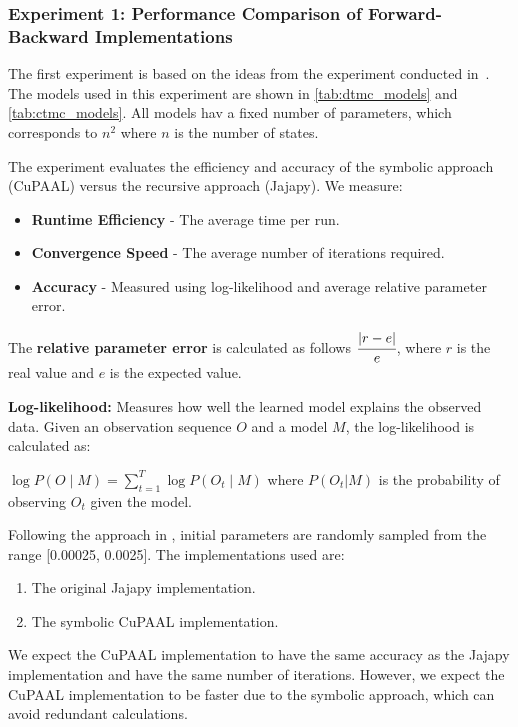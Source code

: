 \subsubsection{Experiment 1: Performance Comparison of Forward-Backward Implementations}
The first experiment is based on the ideas from the experiment conducted in~\cite{reynouard2024learning}.
The models used in this experiment are shown in \autoref{tab:dtmc_models} and \autoref{tab:ctmc_models}.
All models hav a fixed number of parameters, which corresponds to \(n^2\) where \(n\) is the number of states.

The experiment evaluates the efficiency and accuracy of the symbolic approach (CuPAAL) versus the recursive approach (Jajapy). We measure:
\begin{itemize}
    \item \textbf{Runtime Efficiency} - The average time per run.
    \item \textbf{Convergence Speed} - The average number of iterations required.
    \item \textbf{Accuracy} - Measured using log-likelihood and average relative parameter error.
\end{itemize}

The \textbf{relative parameter error} is calculated as follows $\cfrac{|r-e|}{e}$, where $r$ is the real value and $e$ is the expected value.

\textbf{Log-likelihood:} Measures how well the learned model explains the observed data. Given an observation sequence $O$ and a model $M$, the log-likelihood is calculated as:

$\log P(O \mid M) = \sum_{t=1}^{T} \log P(O_t \mid M)$ where $P(O_t|M)$ is the probability of observing $O_t$ given the model.

Following the approach in \cite{bacci2023mm}, initial parameters are randomly sampled from the range
    [0.00025, 0.0025]. The implementations used are:
\begin{enumerate}
    \item The original Jajapy implementation.
    \item The symbolic CuPAAL implementation.
\end{enumerate}

We expect the CuPAAL implementation to have the same accuracy as the Jajapy implementation and have the same number of iterations. However, we expect the CuPAAL implementation to be faster due to the symbolic approach, which can avoid redundant calculations.

